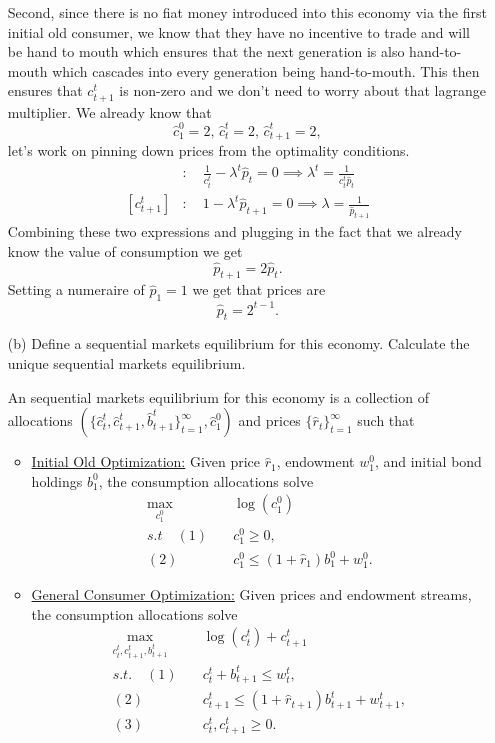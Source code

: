 \documentclass[11pt,english]{article}
\begin{document}
\begin{enumerate}
\begin{solution}
Second, since there is no fiat money introduced into this economy via the first initial old consumer, we know that they have no incentive to trade and will be hand to mouth which ensures that the next generation is also hand-to-mouth which cascades into every generation being hand-to-mouth. This then ensures that $c_{t+1}^t$ is non-zero and we don't need to worry about that lagrange multiplier. We already know that $$\boxed{\hat{c}_1^0 = 2,\, \hat{c}_t^t = 2,\, \hat{c}_{t+1}^t = 2,}$$let's work on pinning down prices from the optimality conditions.
\begin{align*}
[c_t^t]&:\quad \frac{1}{c_t^t} - \lambda^t\hat{p}_t = 0 \implies \lambda^t = \frac{1}{c_t^t\hat{p}_t}\\
[c_{t+1}^t]&:\quad 1 - \lambda^t\hat{p}_{t+1} = 0 \implies \lambda = \frac{1}{\hat{p}_{t+1}}
\end{align*} Combining these two expressions and plugging in the fact that we already know the value of consumption we get $$\hat{p}_{t+1} = 2\hat{p}_t.$$ Setting a numeraire of $\hat{p}_1 = 1$ we get that prices are $$\boxed{\hat{p}_t = 2^{t-1}.}$$
\end{solution}
 
    \item[(b)] Define a sequential markets equilibrium for this economy.
        Calculate the unique sequential markets equilibrium.
    \begin{solution}
 An sequential markets equilibrium for this economy is a collection of allocations $\left(\{\hat{c}_t^t, \hat{c}_{t+1}^t, \hat{b}_{t+1}^t\}_{t=1}^\infty, \hat{c}_1^0\right)$ and prices $\{\hat{r}_t\}_{t=1}^\infty$ such that
\begin{itemize}
\item \underline{Initial Old Optimization:} Given price $\hat{r}_1$, endowment $w_1^0$, and initial bond holdings $b_1^0$, the consumption allocations solve
\begin{align*}
\max_{c_1^0}&\quad \log(c_1^0)\\
s.t\quad (1)&\quad c_1^0 \geq 0,\\
(2)&\quad c_1^0 \leq (1+\hat{r}_1)b_1^0 + w_1^0.
\end{align*}

\item \underline{General Consumer Optimization:} Given prices and endowment streams, the consumption allocations solve
\begin{align*}
\max_{c_t^t, c_{t+1}^t, b_{t+1}^t}&\quad \log(c_t^t) + c_{t+1}^t\\
s.t.\quad (1)&\quad c_t^t  + b_{t+1}^t \leq w_t^t,\\
(2)&\quad c_{t+1}^t  \leq (1+\hat{r}_{t+1})b_{t+1}^t + w_{t+1}^t,\\
(3)&\quad c_t^t, c_{t+1}^t \geq 0.
\end{align*}


\end{itemize}
\end{solution}
\end{enumerate}
\end{document}
